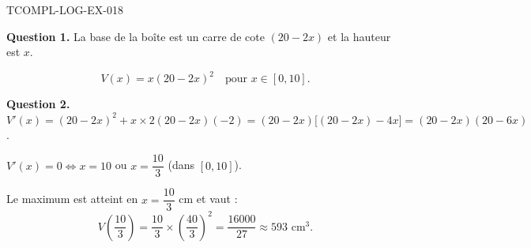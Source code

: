 \begin{corrige}{TCOMPL-LOG-EX-018}

\textbf{Question 1.} La base de la boîte est un carre de cote $(20 - 2x)$ et la hauteur est $x$.


\[ V(x) = x(20 - 2x)^2 \quad \text{pour } x \in [0, 10]. \]

\textbf{Question 2.} $V'(x) = (20-2x)^2 + x \times 2(20-2x)(-2) = (20-2x)\bigl[(20-2x) - 4x\bigr] = (20-2x)(20-6x)$.

$V'(x) = 0 \iff x = 10$ ou $x = \dfrac{10}{3}$ (dans $[0,10]$).

Le maximum est atteint en $x = \dfrac{10}{3}$ cm et vaut :
\[ V\!\left(\dfrac{10}{3}\right) = \dfrac{10}{3} \times \left(\dfrac{40}{3}\right)^2 = \dfrac{16000}{27} \approx 593 \text{ cm}^3. \]

\end{corrige}
